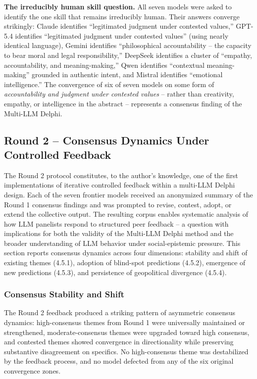 \documentclass[preprint,review,12pt]{elsarticle}
\begin{document}
\textbf{The irreducibly human skill question.} All seven models were asked to identify the one skill that remains irreducibly human. Their answers converge strikingly: Claude identifies ``legitimated judgment under contested values,'' GPT-5.4 identifies ``legitimated judgment under contested values'' (using nearly identical language), Gemini identifies ``philosophical accountability -- the capacity to bear moral and legal responsibility,'' DeepSeek identifies a cluster of ``empathy, accountability, and meaning-making,'' Qwen identifies ``contextual meaning-making'' grounded in authentic intent, and Mistral identifies ``emotional intelligence.'' The convergence of six of seven models on some form of \textit{accountability and judgment under contested values} -- rather than creativity, empathy, or intelligence in the abstract -- represents a consensus finding of the Multi-LLM Delphi.


\subsection{Round 2 -- Consensus Dynamics Under Controlled Feedback}
\label{sec:round2_results}

The Round 2 protocol constitutes, to the author's knowledge, one of the first implementations of iterative controlled feedback within a multi-LLM Delphi design. Each of the seven frontier models received an anonymized summary of the Round 1 consensus findings and was prompted to revise, contest, adopt, or extend the collective output. The resulting corpus enables systematic analysis of how LLM panelists respond to structured peer feedback -- a question with implications for both the validity of the Multi-LLM Delphi method and the broader understanding of LLM behavior under social-epistemic pressure. This section reports consensus dynamics across four dimensions: stability and shift of existing themes (4.5.1), adoption of blind-spot predictions (4.5.2), emergence of new predictions (4.5.3), and persistence of geopolitical divergence (4.5.4).

\subsubsection{Consensus Stability and Shift}
\label{sec:consensus_stability}

The Round 2 feedback produced a striking pattern of asymmetric consensus dynamics: high-consensus themes from Round 1 were universally maintained or strengthened, moderate-consensus themes were upgraded toward high consensus, and contested themes showed convergence in directionality while preserving substantive disagreement on specifics. No high-consensus theme was destabilized by the feedback process, and no model defected from any of the six original convergence zones.
\end{document}
